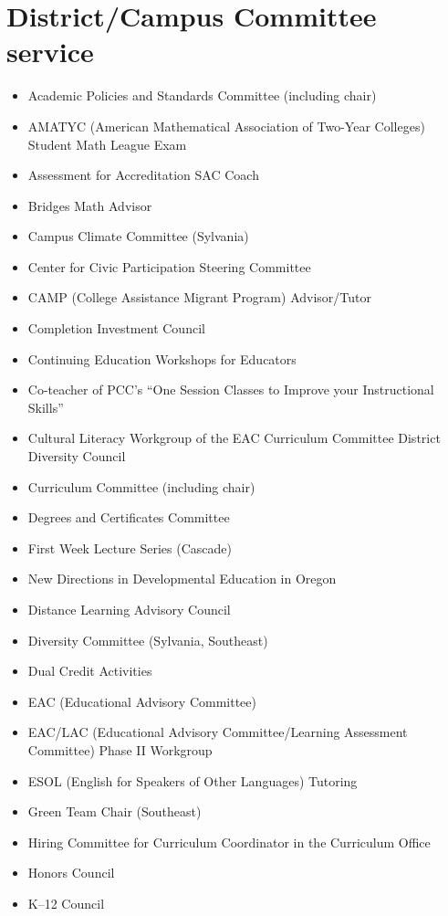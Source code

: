 \section*{District/Campus Committee service}

\begin{itemize}[label={}]
\item Academic Policies and Standards Committee (including chair)
\item AMATYC (American Mathematical Association of Two-Year Colleges) Student Math League Exam
\item Assessment for Accreditation SAC Coach
\item Bridges Math Advisor
\item Campus Climate Committee (Sylvania)
\item Center for Civic Participation Steering Committee
\item CAMP (College Assistance Migrant Program) Advisor/Tutor
\item Completion Investment Council
\item Continuing Education Workshops for Educators
\item Co-teacher of PCC's ``One Session Classes to Improve your Instructional Skills''
\item Cultural Literacy Workgroup of the EAC Curriculum Committee District Diversity Council
\item Curriculum Committee (including chair)
\item Degrees and Certificates Committee
\item First Week Lecture Series (Cascade)
\item New Directions in Developmental Education in Oregon
\item Distance Learning Advisory Council
\item Diversity Committee (Sylvania, Southeast)
\item Dual Credit Activities
\item EAC (Educational Advisory Committee)
\item EAC/LAC (Educational Advisory Committee/Learning Assessment Committee) Phase II Workgroup
\item ESOL (English for Speakers of Other Languages) Tutoring
\item Green Team Chair (Southeast)
\item Hiring Committee for Curriculum Coordinator in the Curriculum Office
\item Honors Council
\item K--12 Council

\end{itemize}

